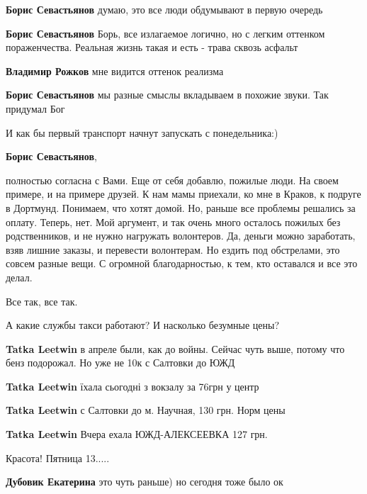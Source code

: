 \begin{itemize}
\begin{itemize}
\textbf{Борис Севастьянов} думаю, это все люди обдумывают в первую очередь

\textbf{Борис Севастьянов} Борь, все излагаемое логично, но с легким оттенком пораженчества.
Реальная жизнь такая и есть - трава сквозь асфальт

\textbf{Владимир Рожков} мне видится оттенок реализма

\textbf{Борис Севастьянов} мы разные смыслы вкладываем в похожие звуки. Так придумал Бог

И как бы первый транспорт начнут запускать с понедельника:)

\textbf{Борис Севастьянов}, 

полностью согласна с Вами. Еще от себя добавлю, пожилые люди. На своем примере,
и на примере друзей. К нам мамы приехали, ко мне в Краков, к подруге в
Дортмунд. Понимаем, что хотят домой. Но, раньше все проблемы решались за оплату.
Теперь, нет. Мой аргумент, и так очень много осталось пожилых без
родственников, и не нужно нагружать волонтеров. Да, деньги можно заработать,
взяв лишние заказы, и перевести волонтерам. Но ездить под обстрелами, это
совсем разные вещи. С огромной благодарностью, к тем, кто оставался и все это
делал.

\end{itemize} %

Все так, все так.

А какие службы такси работают? И насколько безумные цены?

\begin{itemize} %
\textbf{Tatka Leetwin} в апреле были, как до войны. Сейчас чуть выше, потому что бенз подорожал. Но уже не 10к с Салтовки до ЮЖД

\textbf{Tatka Leetwin} їхала сьогодні з вокзалу за 76грн у центр

\textbf{Tatka Leetwin} с Салтовки до м. Научная, 130 грн. Норм цены

\textbf{Tatka Leetwin} Вчера ехала ЮЖД-АЛЕКСЕЕВКА 127 грн.

\end{itemize} %

Красота! Пятница 13.....

\textbf{Дубовик Екатерина} это чуть раньше) но сегодня тоже было ок


\end{itemize}
